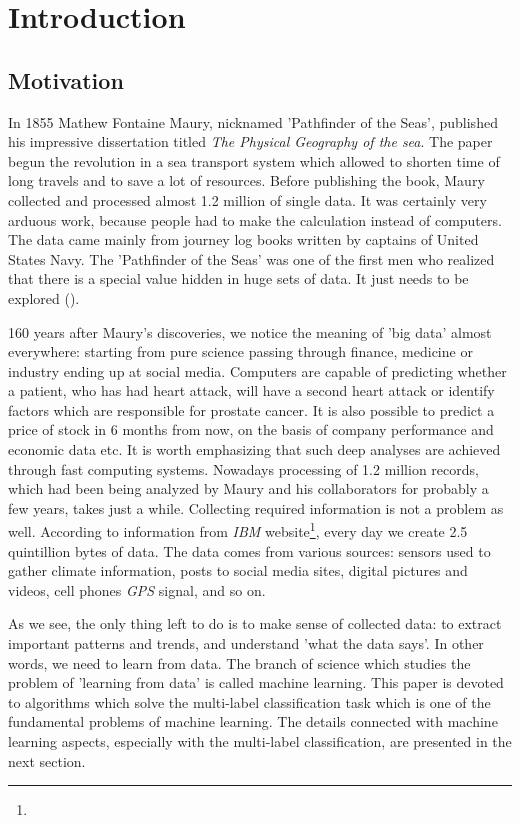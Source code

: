 
\chapter{Introduction}

\section{Motivation}

In 1855 Mathew Fontaine Maury, nicknamed 'Pathfinder of the Seas', published his impressive dissertation titled \textit{The Physical Geography of the sea}. The paper begun the revolution in a sea transport system which allowed to shorten time of long travels and to save a lot of resources. Before publishing the book, Maury collected and processed almost 1.2 million of single data. It was certainly very arduous work, because people had to make the calculation instead of computers. The data came mainly from journey log books written by captains of United States Navy. The 'Pathfinder of the Seas' was one of the first men who realized that there is a special value hidden in huge sets of data. It just needs to be explored (\cite{Data}).  

160 years after Maury's discoveries, we notice the meaning of 'big data' almost everywhere: starting from pure science passing through finance, medicine or industry ending up at social media. Computers are capable of predicting whether a patient, who has had heart attack, will have a second heart attack or identify factors which are responsible for prostate cancer. It is also possible to predict a price of stock in 6 months from now, on the basis of company performance and economic data etc.
It is worth emphasizing that such deep analyses are achieved through fast computing systems. Nowadays processing of 1.2 million records, which had been being analyzed by Maury and his collaborators for probably a few years, takes just a while. Collecting required information is not a problem as well. According to information from \textit{IBM} website\footnote{}, every day we create 2.5 quintillion bytes of data. The data comes from various sources: sensors used to gather climate information, posts to social media sites, digital pictures and videos, cell phones \textit{GPS} signal, and so on.

As we see, the only thing left to do is to make sense of collected data: to extract important patterns and trends, and understand 'what the data says'. In other words, we need to learn from data. The branch of science which studies the problem of 'learning from data' is called machine learning. This paper is devoted to algorithms which solve the multi-label classification task which is one of the fundamental problems of machine learning. The details connected with machine learning aspects, especially with the multi-label classification, are presented in the next section.



